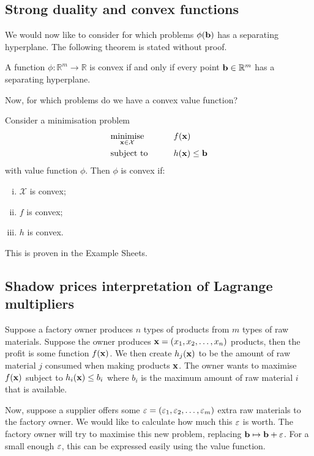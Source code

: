 \subsection{Strong duality and convex functions}
We would now like to consider for which problems \( \phi(\vb b) \) has a separating hyperplane.
The following theorem is stated without proof.
\begin{theorem}
	A function \( \phi \colon \mathbb R^m \to \mathbb R \) is convex if and only if every point \( \vb b \in \mathbb R^m \) has a separating hyperplane.
\end{theorem}
Now, for which problems do we have a convex value function?
\begin{theorem}
	Consider a minimisation problem
	\begin{alignat*}{2}
		 & \underset{\vb x \in \mathcal X}{\text{minimise}} & \qquad & f(\vb x)            \\
		 & \text{subject to}                                &        & h(\vb x) \leq \vb b
	\end{alignat*}
	with value function \( \phi \).
	Then \( \phi \) is convex if:
	\begin{enumerate}[(i)]
		\item \( \mathcal X \) is convex;
		\item \( f \) is convex;
		\item \( h \) is convex.
	\end{enumerate}
\end{theorem}
\noindent This is proven in the Example Sheets.

\subsection{Shadow prices interpretation of Lagrange multipliers}
Suppose a factory owner produces \( n \) types of products from \( m \) types of raw materials.
Suppose the owner produces \( \vb x = (x_1, x_2, \dots, x_n) \) products, then the profit is some function \( f(\vb x) \).
We then create \( h_j(\vb x) \) to be the amount of raw material \( j \) consumed when making products \( \vb x \).
The owner wants to maximise \( f(\vb x) \) subject to \( h_i(\vb x) \leq b_i \) where \( b_i \) is the maximum amount of raw material \( i \) that is available.

Now, suppose a supplier offers some \( \vb\varepsilon = (\varepsilon_1, \varepsilon_2, \dots, \varepsilon_m) \) extra raw materials to the factory owner.
We would like to calculate how much this \( \vb\varepsilon \) is worth.
The factory owner will try to maximise this new problem, replacing \( \vb b \mapsto \vb b + \vb\varepsilon \).
For a small enough \( \vb\varepsilon \), this can be expressed easily using the value function.

